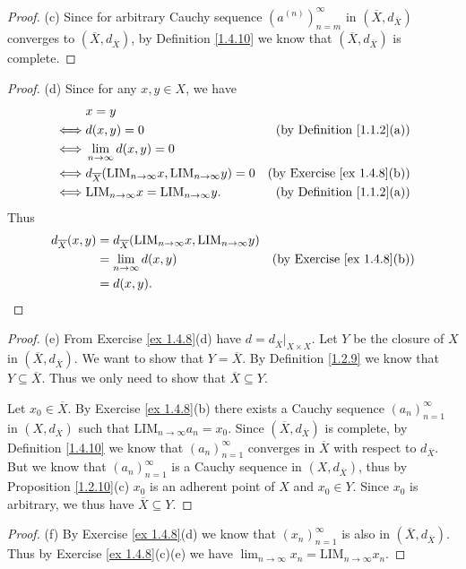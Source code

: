 \begin{proof}{(c)}
    Since for arbitrary Cauchy sequence \((a^{(n)})_{n = m}^\infty\) in \((\overline{X}, d_{\overline{X}})\) converges to \((\overline{X}, d_{\overline{X}})\), by Definition \ref{1.4.10} we know that \((\overline{X}, d_{\overline{X}})\) is complete.
\end{proof}

\begin{proof}{(d)}
    Since for any \(x, y \in X\), we have
    \begin{align*}
             & x = y                                                                                                                   \\
        \iff & d(x, y) = 0                                                                    & \text{(by Definition \ref{1.1.2}(a))}  \\
        \iff & \lim_{n \to \infty} d(x, y) = 0                                                                                         \\
        \iff & d_{\overline{X}}(\text{LIM}_{n \to \infty} x, \text{LIM}_{n \to \infty} y) = 0 & \text{(by Exercise \ref{ex 1.4.8}(b))} \\
        \iff & \text{LIM}_{n \to \infty} x = \text{LIM}_{n \to \infty} y.                     & \text{(by Definition \ref{1.1.2}(a))}
    \end{align*}
    Thus
    \begin{align*}
        d_{\overline{X}}(x, y) & = d_{\overline{X}}(\text{LIM}_{n \to \infty} x, \text{LIM}_{n \to \infty} y)                                          \\
                               & = \lim_{n \to \infty} d(x, y)                                                & \text{(by Exercise \ref{ex 1.4.8}(b))} \\
                               & = d(x, y).
    \end{align*}
\end{proof}

\begin{proof}{(e)}
    From Exercise \ref{ex 1.4.8}(d) have \(d = d_{\overline{X}}|_{X \times X}\).
    Let \(Y\) be the closure of \(X\) in \((\overline{X}, d_{\overline{X}})\).
    We want to show that \(Y = \overline{X}\).
    By Definition \ref{1.2.9} we know that \(Y \subseteq \overline{X}\).
    Thus we only need to show that \(\overline{X} \subseteq Y\).

    Let \(x_0 \in \overline{X}\).
    By Exercise \ref{ex 1.4.8}(b) there exists a Cauchy sequence \((a_n)_{n = 1}^\infty\) in \((X, d_{\overline{X}})\) such that \(\text{LIM}_{n \to \infty} a_n = x_0\).
    Since \((\overline{X}, d_{\overline{X}})\) is complete, by Definition \ref{1.4.10} we know that \((a_n)_{n = 1}^\infty\) converges in \(\overline{X}\) with respect to \(d_{\overline{X}}\).
    But we know that \((a_n)_{n = 1}^\infty\) is a Cauchy sequence in \((X, d_{\overline{X}})\), thus by Proposition \ref{1.2.10}(c) \(x_0\) is an adherent point of \(X\) and \(x_0 \in Y\).
    Since \(x_0\) is arbitrary, we thus have \(\overline{X} \subseteq Y\).
\end{proof}

\begin{proof}{(f)}
    By Exercise \ref{ex 1.4.8}(d) we know that \((x_n)_{n = 1}^\infty\) is also in \((\overline{X}, d_{\overline{X}})\).
    Thus by Exercise \ref{ex 1.4.8}(c)(e) we have \(\lim_{n \to \infty} x_n = \text{LIM}_{n \to \infty} x_n\).
\end{proof}